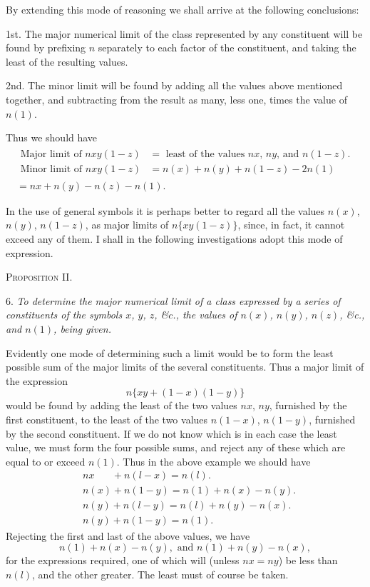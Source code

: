 \documentclass[oneside]{book}
\begin{document}
By extending this mode of reasoning we shall arrive at the
following conclusions:

1st. The major numerical limit of the class represented by
any constituent will be found by prefixing $n$ separately to each
factor of the constituent, and taking the least of the resulting
values.

2nd. The minor limit will be found by adding all the values
above mentioned together, and subtracting from the result as
many, less one, times the value of $n(1)$.

Thus we should have
\begin{multline*}
 \begin{aligned}
  \text{Major limit of }nxy(1-z) &=
      \text{ least of the values $nx$, $ny$, and $n(1-z)$.}   \\
  \text{Minor limit of }nxy(1-z) &= n(x) + n(y) + n(1-z) - 2n(1)
 \end{aligned}
\\= nx + n(y) -n(z) - n(1).
\end{multline*}

In the use of general symbols it is perhaps better to regard all
the values $n(x)$, $n(y)$, $n(1-z)$, as major limits of $n\{xy(1-z)\}$,
since, in fact, it cannot exceed any of them. I shall in the following investigations adopt this mode of expression.

\begin{center}\textsc{Proposition II.}\end{center}

6. \emph{To determine the major numerical limit of a class expressed
by a series of constituents of the symbols $x$, $y$, $z$, \&$c$., the values of
$n(x)$, $n(y)$, $n(z)$, \&c., and $n(1)$, being given.}

Evidently one mode of determining such a limit would be to
form the least possible sum of the major limits of the several constituents.
Thus a major limit of the expression
\[
  n\{xy + (1-x)(1-y)\}
\]
would be found by adding the least of the two values $nx$, $ny$, furnished
by the first constituent, to the least of the two values
$n(1-x)$, $n(1-y)$, furnished by the second constituent. If we
do not know which is in each case the least value, we must form
the four possible sums, and reject any of these which are equal to
or exceed $n(1)$. Thus in the above example we should have
\begin{align*}
&nx\phantom{()} + n(l-x) = n(l).\\
&n(x)           + n(1-y) = n(1) + n(x)-n(y).\\
&n(y)           + n(l-y) = n(l) + n(y)-n(x).\\
&n(y)           + n(1-y) = n(1).
\end{align*}
Rejecting the first and last of the above values, we have
\[n(1) +n(x)-n(y), \text{ and } n(1) + n(y)- n(x),\]
for the expressions required, one of which will (unless $nx = ny$)
be less than $n(l)$, and the other greater. The least must of
course be taken.
\end{document}

